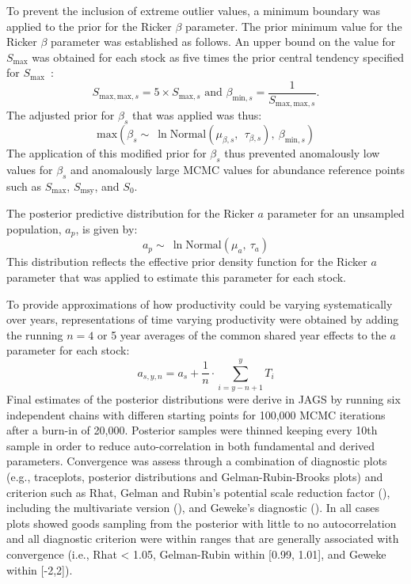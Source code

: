 \documentclass[french,11pt]{book}
\begin{document}
To prevent the inclusion of extreme outlier values, a minimum boundary was applied to the prior for the Ricker \(\beta\) parameter. The prior minimum value for the Ricker \(\beta\) parameter was established as follows. An upper bound on the value for \(S_\textrm{max}\) was obtained for each stock as five times the prior central tendency specified for \(S_\textrm{max}\)~:
\begin{equation}
  S_{\textrm{max},\textrm{max},s} = 5 \times S_{\textrm{max},s} \textrm{ and } \beta_{\textrm{min},s}=\frac{1}{S_{\textrm{max},\textrm{max},s}}. 
\end{equation}
The adjusted prior for \(\beta_s\) that was applied was thus:
\begin{equation}
  \textrm{max}\left(\beta_s \sim \ \ln \textrm{Normal}\left(\mu_{\beta,s},\ \ \tau_{\beta,s}\right),\ \beta_{\textrm{min},s}\right)
\end{equation}
The application of this modified prior for \(\beta_s\) thus prevented anomalously low values for \(\beta_s\) and anomalously large MCMC values for abundance reference points such as \(S_\textrm{max}\), \(S_\textrm{msy}\), and \(S_0\).

The posterior predictive distribution for the Ricker \(a\) parameter for an unsampled population, \(a_p\), is given by:
\begin{equation}
  a_p \sim\  \ln \textrm{Normal}\left(\mu_a,\ \tau_a\right)
  \label{eq:unsamp}
\end{equation}
This distribution reflects the effective prior density function for the Ricker \(a\) parameter that was applied to estimate this parameter for each stock.

To provide approximations of how productivity could be varying systematically over years, representations of time varying productivity were obtained by adding the running \(n = 4\) or 5 year averages of the common shared year effects to the \(a\) parameter for each stock:
\begin{equation}
  a_{s,y,n}=a_s+\frac{1}{n}\cdot\sum_{i=y-n+1}^{y}T_i
  \label{eq:timevarprod}
\end{equation}
Final estimates of the posterior distributions were derive in JAGS by running six independent chains with differen starting points for 100,000 MCMC iterations after a burn-in of 20,000. Posterior samples were thinned keeping every 10th sample in order to reduce auto-correlation in both fundamental and derived parameters. Convergence was assess through a combination of diagnostic plots (e.g., traceplots, posterior distributions and Gelman-Rubin-Brooks plots) and criterion such as Rhat, Gelman and Rubin's potential scale reduction factor (), including the multivariate version (), and Geweke's diagnostic (). In all cases plots showed goods sampling from the posterior with little to no autocorrelation and all diagnostic criterion were within ranges that are generally associated with convergence (i.e., Rhat \textless{} 1.05, Gelman-Rubin within {[}0.99, 1.01{]}, and Geweke within {[}-2,2{]}).
\end{document}
